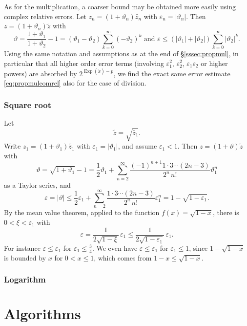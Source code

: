 \documentclass [11pt]{article}
\newcommand {\corr}[1]{{#1}}
\newcommand {\appro}[1]{\widetilde {#1}}
\DeclareMathOperator{\Exp}{\operatorname {Exp}}
\renewcommand {\epsilon}{\varepsilon}
\renewcommand {\theta}{\vartheta}
\renewcommand {\leq}{\leqslant}
\begin{document}
As for the multiplication, a coarser
bound may be obtained more easily using complex relative errors.
Let $\corr {z_n} = (1 + \theta_n) \appro {z_n}$ with
$\epsilon_n = | \theta_n |$. Then $\corr z = (1 + \theta_n) \appro z$
with
\[
\theta = \frac {1 + \theta_1}{1 + \theta_2} - 1
= (\theta_1 - \theta_2) \sum_{k = 0}^\infty (- \theta_2)^k
\text { and }
\epsilon \leq (|\theta_1| + |\theta_2|) \sum_{k = 0}^\infty |\theta_2|^k.
\]
Using the same notation and assumptions as at the end of
\S\ref {sssec:propmul}, in particular that all higher order error terms
(involving $\epsilon_1^2$, $\epsilon_2^2$, $\epsilon_1 \epsilon_2$
or higher powers) are absorbed by $2^{\Exp (\appro x) - p}$,
we find the exact same error estimate \eqref {eq:propmulcomrel}
also for the case of division.


\subsubsection {Square root}
Let
\[
\appro z = \sqrt {\appro {z_1}}.
\]
Write $\corr {z_1} = (1 + \theta_1) \appro {z_1}$ with
$\epsilon_1 = |\theta_1|$, and assume $\epsilon_1 < 1$.
Then $\corr z = (1 + \theta) \appro z$ with
\[
\theta = \sqrt {1 + \theta_1} - 1
= \frac {1}{2} \theta_1
+ \sum_{n=2}^\infty \frac {(-1)^{n+1} 1 \cdot 3 \cdots (2 n - 3)}{2^n \, n!}
   \theta_1^n
\]
as a Taylor series, and
\[
\epsilon = |\theta|
\leq
\frac {1}{2}  \epsilon_1
+ \sum_{n=2}^\infty \frac {1 \cdot 3 \cdots (2 n - 3)}{2^n \, n!}
\epsilon_1^n
= 1 - \sqrt {1 - \epsilon_1}.
\]
By the mean value theorem, applied to the function $f (x) = \sqrt {1 - x}$,
there is $0 < \xi < \epsilon_1$ with
\begin {equation}
\label {eq:propsqrt}
\epsilon = \frac {1}{2 \sqrt {1 - \xi}} \, \epsilon_1
\leq \frac {1}{2 \sqrt {1 - \epsilon_1}} \, \epsilon_1.
\end {equation}
For instance $\epsilon \leq \epsilon_1$ for $\epsilon_1 \leq \frac {3}{4}$.
We even have $\epsilon \leq \epsilon_1$ for $\epsilon_1 \leq 1$,
since $1 - \sqrt{1-x}$ is bounded by $x$
for $0 < x \leq 1$, which comes from $1 - x \leq \sqrt{1-x}$.


\subsubsection {Logarithm}



\section {Algorithms}
\end{document}
